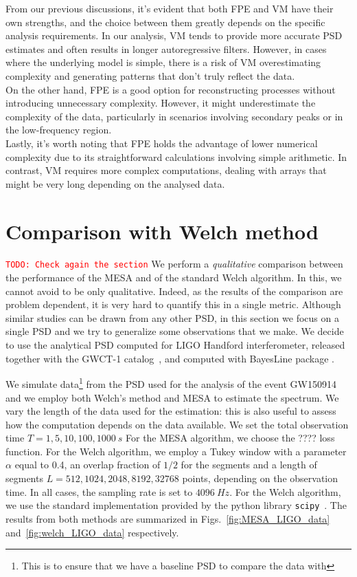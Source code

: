 \documentclass{aa}
\newcommand{\todo}[1]{{\textcolor{red}{\texttt{TODO: #1}} }}
\begin{document}
From our previous discussions, it's evident that both FPE and VM have their own strengths, and the choice between them greatly depends on the specific analysis requirements. In our analysis, VM tends to provide more accurate PSD estimates and often results in longer autoregressive filters. However, in cases where the underlying model is simple, there is a risk of VM overestimating complexity and generating patterns that don't truly reflect the data.\\ 
On the other hand, FPE is a good option for reconstructing processes without introducing unnecessary complexity. However, it might underestimate the complexity of the data, particularly in scenarios involving secondary peaks or in the low-frequency region.\\ 

Lastly, it's worth noting that FPE holds the advantage of lower numerical complexity due to its straightforward calculations involving simple arithmetic. In contrast, VM requires more complex computations, dealing with arrays that might be very long depending on the analysed data.

\section{Comparison with Welch method}\label{sec:Welch_comparison}
\todo{Check again the section}
We perform a {\it qualitative} comparison between the performance of the MESA and of the standard Welch algorithm.
In this, we cannot avoid to be only qualitative. Indeed, as the results of the comparison are problem dependent, it is very hard to quantify this in a single metric. Although similar studies can be drawn from any other PSD, in this section we focus on a single PSD and we try to generalize some observations that we make.
We decide to use the analytical PSD computed for LIGO Handford interferometer, released together with the GWCT-1 catalog~\citep{GWTC1, PSD_release}, and computed with BayesLine package \citep{Cornish_2015, Littenberg_2015, Cornish_2020, Chatziioannou_2019}.

We simulate data\footnote{This is to ensure that we have a baseline PSD to compare the data with} from the PSD used for the analysis of the event GW150914 and we employ both Welch's method and MESA to estimate the spectrum.
We vary the length of the data used for the estimation: this is also useful to assess how the computation depends on the data available. We set the total observation time $T = 1, 5, 10, 100, 1000 \SI{}{s}$
For the MESA algorithm, we choose the ???? loss function. For the Welch algorithm, we employ a Tukey window with a parameter $\alpha$ 
equal to 0.4, an overlap fraction of $1/2$ for the segments and a length of 
segments $L = 512, 1024, 2048, 8192, 32768$ points, depending on the observation time.
In all cases, the sampling rate is set to $\SI{4096}{Hz}$.
For the Welch algorithm, we use the standard implementation provided by the python library \texttt{scipy}~\citep{numpy,scipy}.
The results from both methods are summarized in  Figs.~\ref{fig:MESA_LIGO_data} and~\ref{fig:welch_LIGO_data} respectively.
\end{document}
